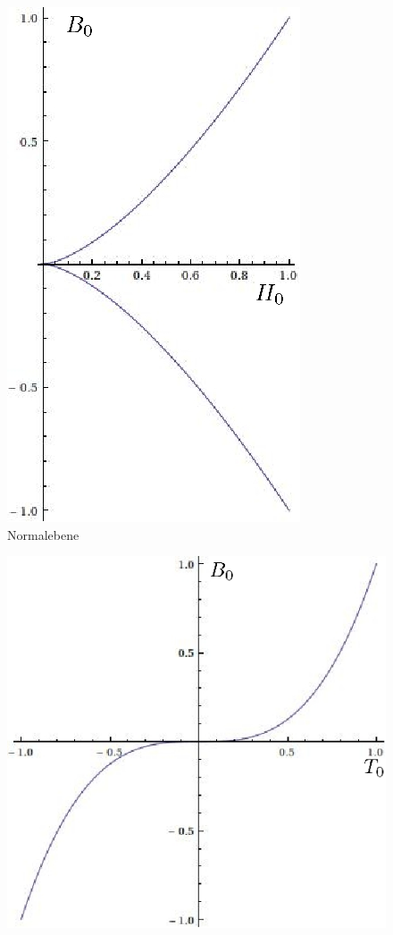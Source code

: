 \begin{folgerung}
\begin{enumerate}
\begin{figure}[ht]
\begin{minipage}{5cm}
   \includegraphics[scale=0.2]{Bilder/H0B0.jpg} \\
   Normalebene
  \end{minipage} 
  \begin{minipage}{5cm}
  \centering
  \includegraphics[scale=0.2]{Bilder/T0B0.jpg} \\

\end{minipage}
\end{figure}
\end{enumerate}
\end{folgerung}
